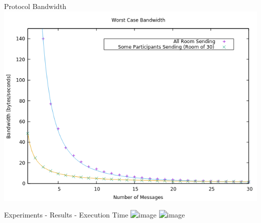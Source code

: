 \begin{frame}{Protocol Bandwidth}
    \centering
    \includegraphics[scale=0.6]{images/bandwidth.png}
\end{frame}

\begin{frame}{Experiments - Results - Execution Time}
    \centering
    \includegraphics<1-1>[scale=0.3]{images/fixed_room.png}
    \includegraphics<2>[scale=0.3]{images/variable_room.png}
\end{frame}